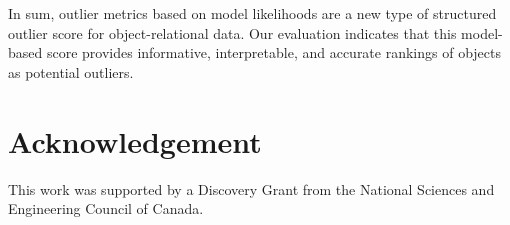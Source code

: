 \documentclass[conference]{IEEEtran}
\begin{document}
								
								In sum, outlier metrics based on model likelihoods are a new type of structured outlier score for object-relational data.  Our evaluation indicates that this model-based score provides informative, interpretable, and accurate rankings of objects as potential outliers. 
								
				\section*{Acknowledgement}
This work was supported by a Discovery Grant from the National Sciences and Engineering Council of Canada. 				
								
								
								
								
							
\end{document}
